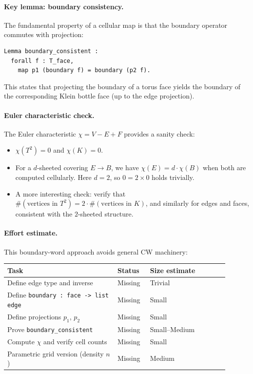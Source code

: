 \documentclass[11pt,a4paper]{article}
\theoremstyle{definition}
\theoremstyle{remark}
\begin{document}
\paragraph{Key lemma: boundary consistency.}
The fundamental property of a cellular map is that the boundary operator commutes with projection:
\begin{verbatim}
Lemma boundary_consistent :
  forall f : T_face,
    map p1 (boundary f) = boundary (p2 f).
\end{verbatim}
This states that projecting the boundary of a torus face yields the boundary of the corresponding Klein bottle face (up to the edge projection).

\paragraph{Euler characteristic check.}
The Euler characteristic \(\chi = V - E + F\) provides a sanity check:
\begin{itemize}
  \item \(\chi(T^2) = 0\) and \(\chi(K) = 0\).
  \item For a \(d\)-sheeted covering \(E\to B\), we have \(\chi(E) = d\cdot\chi(B)\) when both are computed cellularly. Here \(d=2\), so \(0 = 2\times 0\) holds trivially.
  \item A more interesting check: verify that \(\#(\text{vertices in }T^2) = 2\cdot\#(\text{vertices in }K)\), and similarly for edges and faces, consistent with the \(2\)-sheeted structure.
\end{itemize}

\paragraph{Effort estimate.}
This boundary-word approach avoids general CW machinery:
\begin{center}
\begin{tabular}{p{0.45\linewidth} p{0.13\linewidth} p{0.32\linewidth}}
\hline
\textbf{Task} & \textbf{Status} & \textbf{Size estimate}\\
\hline
Define edge type and inverse & Missing & Trivial\\
Define \texttt{boundary : face -> list edge} & Missing & Small\\
Define projections \(p_1\), \(p_2\) & Missing & Small\\
Prove \texttt{boundary\_consistent} & Missing & Small--Medium\\
Compute \(\chi\) and verify cell counts & Missing & Small\\
Parametric grid version (density \(n\)) & Missing & Medium\\
\hline
\end{tabular}
\end{center}
\end{document}
